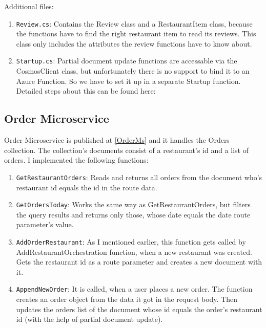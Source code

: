 Additional files: 

\begin{enumerate}
	\item \verb+Review.cs+: Contains the Review class and a RestaurantItem class, because the functions have to find the right restaurant item to read its reviews. This class only includes the attributes the review functions have to know about.
	
	\item \verb+Startup.cs+: Partial document update functions are accessable via the CosmosClient class, but unfortunately there is no support to bind it to an Azure Function. So we have to set it up in a separate Startup function. Detailed steps about this can be found here: \cite{CosmosClient}
\end{enumerate}

\subsection{Order Microservice}\label{OrderMicroservice}

Order Microservice is published at \ref{OrderMs} and it handles the Orders collection. The collection's documents consist of a restaurant's id and a list of orders. 
I implemented the following functions:

\begin{enumerate}
	\item \verb+GetRestaurantOrders+: Reads and returns all orders from the document who's restaurant id equals the id in the route data. 
	
	\item \verb+GetOrdersToday+: Works the same way as GetRestaurantOrders, but filters the query results and returns only those, whose date equals the date route parameter's value.
	
	\item \verb+AddOrderRestaurant+: As I mentioned earlier, this function gets called by AddRestaurantOrchestration function, when a new restaurant was created. Gets the restaurant id as a route parameter and creates a new document with it. 
	
	\item \verb+AppendNewOrder+: It is called, when a user places a new order. The function creates an order object from the data it got in the request body. Then updates the orders list of the document whose id equals the order's restaurant id (with the help of partial document update).  

\end{enumerate}

